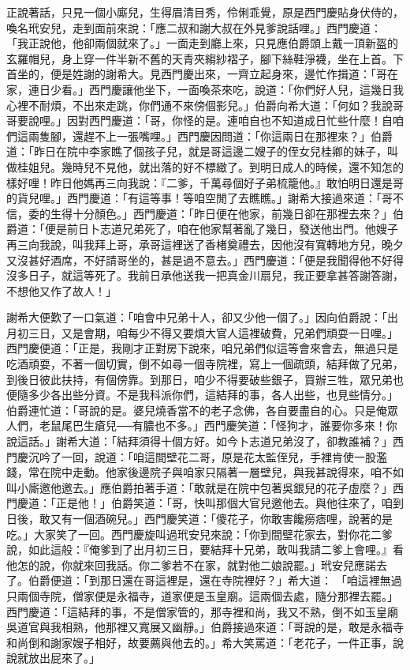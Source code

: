 \begin{showcontents}{}
正說著話，只見一個小廝兒，生得眉清目秀，伶俐乖覺，原是西門慶貼身伏侍的，喚名玳安兒，走到面前來說：「應二叔和謝大叔在外見爹說話哩。」西門慶道： 「我正說他，他卻兩個就來了。」一面走到廳上來，只見應伯爵頭上戴一頂新盔的玄羅帽兒，身上穿一件半新不舊的天青夾縐紗褶子，腳下絲鞋淨襪，坐在上首。下首坐的，便是姓謝的謝希大。見西門慶出來，一齊立起身來，邊忙作揖道：「哥在家，連日少看。」西門慶讓他坐下，一面喚茶來吃，說道：「你們好人兒，這幾日我心裡不耐煩，不出來走跳，你們通不來傍個影兒。」伯爵向希大道：「何如？我說哥哥要說哩。」因對西門慶道：「哥，你怪的是。連咱自也不知道成日忙些什麼！自咱們這兩隻腳，還趕不上一張嘴哩。」西門慶因問道：「你這兩日在那裡來？」伯爵道：「昨日在院中李家瞧了個孩子兒，就是哥這邊二嫂子的侄女兒桂卿的妹子，叫做桂姐兒。幾時兒不見他，就出落的好不標緻了。到明日成人的時候，還不知怎的樣好哩！昨日他媽再三向我說：『二爹，千萬尋個好子弟梳籠他。』敢怕明日還是哥的貨兒哩。」西門慶道：「有這等事！等咱空閒了去瞧瞧。」謝希大接過來道：「哥不信，委的生得十分顏色。」西門慶道：「昨日便在他家，前幾日卻在那裡去來？」伯爵道：「便是前日卜志道兄弟死了，咱在他家幫著亂了幾日，發送他出門。他嫂子再三向我說，叫我拜上哥，承哥這裡送了香楮奠禮去，因他沒有寬轉地方兒，晚夕又沒甚好酒席，不好請哥坐的，甚是過不意去。」西門慶道：「便是我聞得他不好得沒多日子，就這等死了。我前日承他送我一把真金川扇兒，我正要拿甚答謝答謝，不想他又作了故人！」

謝希大便歎了一口氣道：「咱會中兄弟十人，卻又少他一個了。」因向伯爵說：「出月初三日，又是會期，咱每少不得又要煩大官人這裡破費，兄弟們頑耍一日哩。」西門慶便道：「正是，我剛才正對房下說來，咱兄弟們似這等會來會去，無過只是吃酒頑耍，不著一個切實，倒不如尋一個寺院裡，寫上一個疏頭，結拜做了兄弟，到後日彼此扶持，有個傍靠。到那日，咱少不得要破些銀子，買辦三牲，眾兄弟也便隨多少各出些分資。不是我科派你們，這結拜的事，各人出些，也見些情分。」伯爵連忙道：「哥說的是。婆兒燒香當不的老子念佛，各自要盡自的心。只是俺眾人們，老鼠尾巴生瘡兒──有膿也不多。」西門慶笑道：「怪狗才，誰要你多來！你說這話。」謝希大道：「結拜須得十個方好。如今卜志道兄弟沒了，卻教誰補？」西門慶沉吟了一回，說道：「咱這間壁花二哥，原是花太監侄兒，手裡肯使一股濫錢，常在院中走動。他家後邊院子與咱家只隔著一層壁兒，與我甚說得來，咱不如叫小廝邀他邀去。」應伯爵拍著手道：「敢就是在院中包著吳銀兒的花子虛麼？」西門慶道：「正是他！」伯爵笑道：「哥，快叫那個大官兒邀他去。與他往來了，咱到日後，敢又有一個酒碗兒。」西門慶笑道：「傻花子，你敢害饞癆痞哩，說著的是吃。」大家笑了一回。西門慶旋叫過玳安兒來說：「你到間壁花家去，對你花二爹說，如此這般：『俺爹到了出月初三日，要結拜十兄弟，敢叫我請二爹上會哩。』看他怎的說，你就來回我話。你二爹若不在家，就對他二娘說罷。」玳安兒應諾去了。伯爵便道：「到那日還在哥這裡是，還在寺院裡好？」希大道： 「咱這裡無過只兩個寺院，僧家便是永福寺，道家便是玉皇廟。這兩個去處，隨分那裡去罷。」西門慶道：「這結拜的事，不是僧家管的，那寺裡和尚，我又不熟，倒不如玉皇廟吳道官與我相熟，他那裡又寬展又幽靜。」伯爵接過來道：「哥說的是，敢是永福寺和尚倒和謝家嫂子相好，故要薦與他去的。」希大笑罵道：「老花子，一件正事，說說就放出屁來了。」


\end{showcontents}
